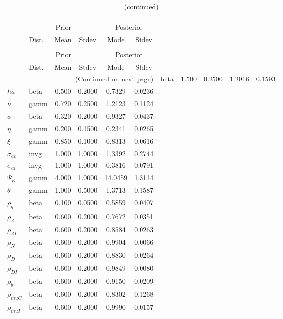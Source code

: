  
\begin{center}
\begin{longtable}{llcccc} 
\caption{Results from posterior maximization (parameters)}\\
 \label{Table:Posterior:1}\\
\toprule 
  & \multicolumn{3}{c}{Prior}  &  \multicolumn{2}{c}{Posterior} \\
  \cmidrule(r{.75em}){2-4} \cmidrule(r{.75em}){5-6}
  & Dist. & Mean  & Stdev & Mode & Stdev \\ 
\midrule \endfirsthead 
\caption{(continued)}\\
 \bottomrule 
  & \multicolumn{3}{c}{Prior}  &  \multicolumn{2}{c}{Posterior} \\
  \cmidrule(r{.75em}){2-4} \cmidrule(r{.75em}){5-6}
  & Dist. & Mean  & Stdev & Mode & Stdev \\ 
\midrule \endhead 
\bottomrule \multicolumn{6}{r}{(Continued on next page)}\endfoot 
\bottomrule\endlastfoot 
${\sigma}$ & beta &   1.500 & 0.2500 &   1.2916 &  0.1593 \\ 
${ha}$ & beta &   0.500 & 0.2000 &   0.7329 &  0.0236 \\ 
$\nu$ & gamm &   0.720 & 0.2500 &   1.2123 &  0.1124 \\ 
${\phi}$ & beta &   0.320 & 0.2000 &   0.9327 &  0.0437 \\ 
${\eta}$ & gamm &   0.200 & 0.1500 &   0.2341 &  0.0265 \\ 
$\xi$ & gamm &   0.850 & 0.1000 &   0.8313 &  0.0616 \\ 
${\sigma_{ac}}$ & invg &   1.000 & 1.0000 &   1.3392 &  0.2744 \\ 
${\sigma_{ai}}$ & invg &   1.000 & 1.0000 &   0.3816 &  0.0791 \\ 
${\Psi_{K}}$ & gamm &   4.000 & 1.0000 &  14.0459 &  1.3114 \\ 
${\theta}$ & gamm &   1.000 & 0.5000 &   1.3713 &  0.1587 \\ 
${\rho_g}$ & beta &   0.100 & 0.0500 &   0.5859 &  0.0407 \\ 
${\rho_Z}$ & beta &   0.600 & 0.2000 &   0.7672 &  0.0351 \\ 
${\rho_{ZI}}$ & beta &   0.600 & 0.2000 &   0.8584 &  0.0263 \\ 
${\rho_N}$ & beta &   0.600 & 0.2000 &   0.9904 &  0.0066 \\ 
${\rho_D}$ & beta &   0.600 & 0.2000 &   0.8830 &  0.0264 \\ 
${\rho_{DI}}$ & beta &   0.600 & 0.2000 &   0.9849 &  0.0080 \\ 
${\rho_b}$ & beta &   0.600 & 0.2000 &   0.9150 &  0.0209 \\ 
${\rho_{muC}}$ & beta &   0.600 & 0.2000 &   0.8302 &  0.1268 \\ 
${\rho_{muI}}$ & beta &   0.600 & 0.2000 &   0.9990 &  0.0157 \\ 
\end{longtable}
 \end{center}
